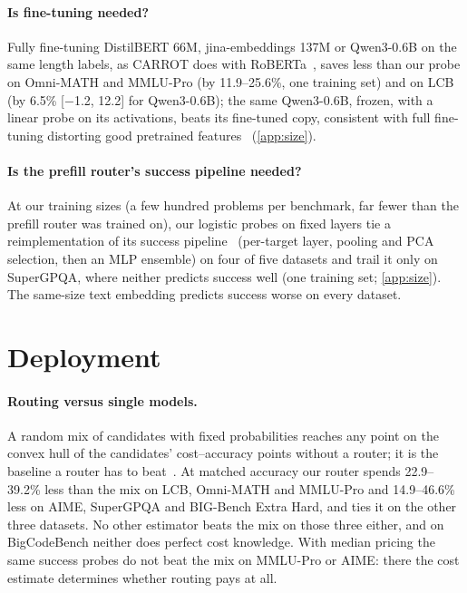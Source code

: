 \documentclass[10pt]{article}
\begin{document}
\paragraph{Is fine-tuning needed?}
Fully fine-tuning DistilBERT 66M, jina-embeddings 137M or Qwen3-0.6B on the same length labels, as CARROT does with RoBERTa~\citep{carrot}, saves less than our probe on Omni-MATH and MMLU-Pro (by 11.9--25.6\%, one training set) and on LCB (by 6.5\% [$-$1.2, 12.2] for Qwen3-0.6B); the same Qwen3-0.6B, frozen, with a linear probe on its activations, beats its fine-tuned copy, consistent with full fine-tuning distorting good pretrained features~\citep{kumar2022finetuning} (\cref{app:size}).

\paragraph{Is the prefill router's success pipeline needed?}
At our training sizes (a few hundred problems per benchmark, far fewer than the prefill router was trained on), our logistic probes on fixed layers tie a reimplementation of its success pipeline~\citep{prefill} (per-target layer, pooling and PCA selection, then an MLP ensemble) on four of five datasets and trail it only on SuperGPQA, where neither predicts success well (one training set; \cref{app:size}). The same-size text embedding predicts success worse on every dataset.

\section{Deployment}\label{sec:deploy}
\paragraph{Routing versus single models.}
A random mix of candidates with fixed probabilities reaches any point on the convex hull of the candidates' cost--accuracy points without a router; it is the baseline a router has to beat~\citep{routerbench}. At matched accuracy our router spends 22.9--39.2\% less than the mix on LCB, Omni-MATH and MMLU-Pro and 14.9--46.6\% less on AIME, SuperGPQA and BIG-Bench Extra Hard, and ties it on the other three datasets. No other estimator beats the mix on those three either, and on BigCodeBench neither does perfect cost knowledge. With median pricing the same success probes do not beat the mix on MMLU-Pro or AIME: there the cost estimate determines whether routing pays at all.
\end{document}
